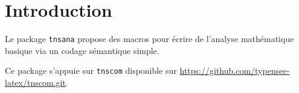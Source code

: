 \documentclass[12pt,a4paper]{article}
\begin{document}
\section{Introduction}

Le package \verb+tnsana+ propose des macros pour écrire de l'analyse mathématique basique via un codage sémantique simple.

\begin{remark}
	Ce package s'appuie sur \verb+tnscom+ disponible sur \url{https://github.com/typensee-latex/tnscom.git}.
\end{remark}
\end{document}
